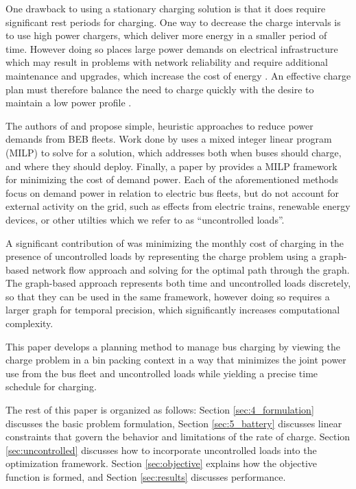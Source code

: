 \par One drawback to using a stationary charging solution is that it does require significant rest periods for charging. One way to decrease the charge intervals is to use high power chargers, which deliver more energy in a smaller period of time. However doing so places large power demands on electrical infrastructure \cite{stahleder_impact_2019} which may result in problems with network reliability \cite{deb_impact_2017} and require additional maintenance and upgrades, which increase the cost of energy \cite{boonraksa_impact_2019}. An effective charge plan must therefore balance the need to charge quickly with the desire to maintain a low power profile \cite{ojer_development_2020}.
\par The authors of \cite{qin_numerical_2016} and \cite{Wang2019} propose simple, heuristic approaches to reduce power demands from BEB fleets. Work done by \cite{bagherinezhad_spatio-temporal_2020} uses a mixed integer linear program (MILP) to solve for a solution, which addresses both when buses should charge, and where they should deploy. Finally, a paper by \cite{He_2019_Fast} provides a MILP framework for minimizing the cost of demand power. Each of the aforementioned methods focus on demand power in relation to electric bus fleets, but do not account for external activity on the grid, such as effects from electric trains, renewable energy devices, or other utilties which we refer to as ``uncontrolled loads''.

\par A significant contribution of \cite{mortensen_comprehensive_2021} was minimizing the monthly cost of charging in the presence of uncontrolled loads by representing the charge problem using a graph-based network flow approach and solving for the optimal path through the graph. The graph-based approach represents both time and uncontrolled loads discretely, so that they can be used in the same framework, however doing so requires a larger graph for temporal precision, which significantly increases computational complexity.  
\par This paper develops a planning method to manage bus charging by viewing the charge problem in a bin packing context \cite{Ma_Mixed-integer_2017} in a way that minimizes the joint power use from the bus fleet and uncontrolled loads while yielding a precise time schedule for charging.
\par The rest of this paper is organized as follows: Section \ref{sec:4_formulation} discusses the basic problem formulation, Section \ref{sec:5_battery} discusses linear constraints that govern the behavior and limitations of the rate of charge. Section \ref{sec:uncontrolled} discusses how to incorporate uncontrolled loads into the optimization framework. Section \ref{sec:objective} explains how the objective function is formed, and Section \ref{sec:results} discusses performance.
